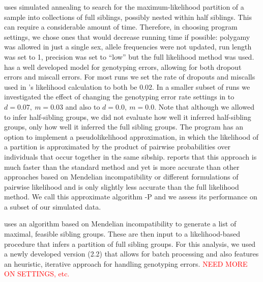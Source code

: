 \documentclass[11pt]{article}
\begin{document}
\colony{} uses simulated annealing to search for the maximum-likelihood partition of a sample into 
collections of full siblings, possibly nested within half siblings.  This can require a considerable 
amount of time.  Therefore, in choosing program settings, we chose ones that would decrease running 
time if possible: polygamy was allowed in just a single sex, allele frequencies were not updated, run 
length was set to 1, precision was set to ``low'' but the full likelihood method was used. \colony{} 
has a well developed model for genotyping errors, allowing for both dropout errors and miscall errors. 
For most runs we set the rate of dropouts and miscalls used in \colony{}'s likelihood calculation to 
both be 0.02.  In a smaller subset of runs we investigated the effect of changing the genotyping error 
rate settings in \colony{} to $d=0.07,\ m=0.03$ and also to $d=0.0,\ m=0.0$.    Note that although we 
allowed \colony{} to infer half-sibling groups, we did not evaluate how well it inferred half-sibling 
groups, only how well it inferred the full sibling groups. The program \colony{} has an option to 
implement a pseudolikelihood approximation, in which the likelihood of a partition is approximated by 
the product of pairwise probabilities over individuals that occur together in the same sibship. 
\citet{Wang2012pairwise} reports that this approach is much faster than the standard \colony{} method 
and yet is more accurate than other approaches based on Mendelian incompatibility or different 
formulations of pairwise likelihood and is only slightly less accurate than the full likelihood method.  
We call this approximate \colony{} algorithm \colony{}-P and we assess its performance on a subset of 
our simulated data.


\prt{} uses an algorithm based on Mendelian incompatibility to generate a list of maximal, feasible 
sibling groups.  These are then input to a likelihood-based procedure that infers a partition of full 
sibling groups.  For this analysis, we used a newly developed version (2.2) that allows for batch 
processing and also features an heuristic, iterative approach for handling genotyping errors. 
\textcolor{red}{NEED MORE ON SETTINGS, etc.}
\end{document}
